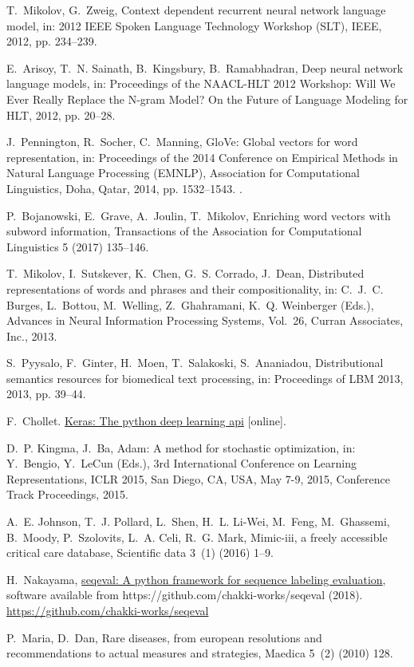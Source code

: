 \documentclass[preprint,12pt]{elsarticle}
\begin{document}
\begin{thebibliography}{10}
T.~Mikolov, G.~Zweig, Context dependent recurrent neural network language
  model, in: 2012 IEEE Spoken Language Technology Workshop (SLT), IEEE, 2012,
  pp. 234--239.

E.~Arisoy, T.~N. Sainath, B.~Kingsbury, B.~Ramabhadran, Deep neural network
  language models, in: Proceedings of the NAACL-HLT 2012 Workshop: Will We Ever
  Really Replace the N-gram Model? On the Future of Language Modeling for HLT,
  2012, pp. 20--28.

J.~Pennington, R.~Socher, C.~Manning, {G}lo{V}e: Global vectors for word
  representation, in: Proceedings of the 2014 Conference on Empirical Methods
  in Natural Language Processing ({EMNLP}), Association for Computational
  Linguistics, Doha, Qatar, 2014, pp. 1532--1543.
\newblock \href {https://doi.org/10.3115/v1/D14-1162}
  {}.

P.~Bojanowski, E.~Grave, A.~Joulin, T.~Mikolov, Enriching word vectors with
  subword information, Transactions of the Association for Computational
  Linguistics 5 (2017) 135--146.

T.~Mikolov, I.~Sutskever, K.~Chen, G.~S. Corrado, J.~Dean, Distributed
  representations of words and phrases and their compositionality, in: C.~J.~C.
  Burges, L.~Bottou, M.~Welling, Z.~Ghahramani, K.~Q. Weinberger (Eds.),
  Advances in Neural Information Processing Systems, Vol.~26, Curran
  Associates, Inc., 2013.

S.~Pyysalo, F.~Ginter, H.~Moen, T.~Salakoski, S.~Ananiadou, Distributional
  semantics resources for biomedical text processing, in: Proceedings of LBM
  2013, 2013, pp. 39--44.

F.~Chollet.
\newblock \href{https://keras.io/}{Keras: The python deep learning api}
  [online].

D.~P. Kingma, J.~Ba, Adam: {A} method for stochastic optimization, in:
  Y.~Bengio, Y.~LeCun (Eds.), 3rd International Conference on Learning
  Representations, {ICLR} 2015, San Diego, CA, USA, May 7-9, 2015, Conference
  Track Proceedings, 2015.

A.~E. Johnson, T.~J. Pollard, L.~Shen, H.~L. Li-Wei, M.~Feng, M.~Ghassemi,
  B.~Moody, P.~Szolovits, L.~A. Celi, R.~G. Mark, Mimic-iii, a freely
  accessible critical care database, Scientific data 3~(1) (2016) 1--9.

H.~Nakayama, \href{https://github.com/chakki-works/seqeval}{{seqeval}: A python
  framework for sequence labeling evaluation}, software available from
  https://github.com/chakki-works/seqeval (2018).
\newline\urlprefix\url{https://github.com/chakki-works/seqeval}

P.~Maria, D.~Dan, Rare diseases, from european resolutions and recommendations
  to actual measures and strategies, Maedica 5~(2) (2010) 128.

\end{thebibliography}

\end{document}
